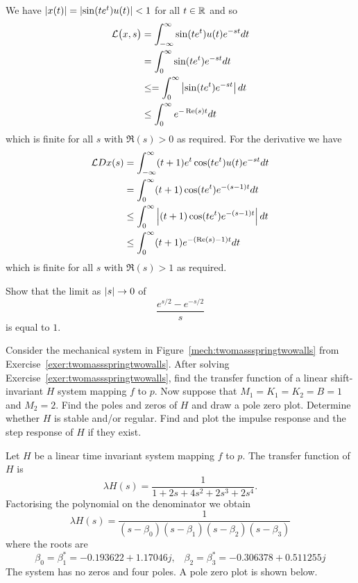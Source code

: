 \begin{excersizelist}
\begin{solution}
We have $\left\vert x(t) \right\vert = \left\vert \sin(t e^t) u(t) \right\vert < 1$ for all $t \in {\mathbb R}$ and so
\begin{align*}
\mathcal L\big( x , s\big) &= \int_{-\infty}^\infty \sin(t e^t) u(t) e^{-s t} dt \\
&= \int_{0}^\infty \sin(t e^t) e^{-s t}  dt \\
&\leq = \int_{0}^\infty \left\vert \sin(t e^t) e^{-s t} \right\vert  dt \\
&\leq \int_{0}^\infty e^{-\operatorname{Re}(s) t}  dt
\end{align*}
which is finite for all $s$ with $\Re(s) > 0$ as required.  For the derivative we have
\begin{align*}
\mathcal L D x (s) &= \int_{-\infty}^\infty (t+1)e^t \cos(t e^t) u(t) e^{-s t} dt \\
&= \int_{0}^\infty (t+1) \cos(t e^t) e^{-(s-1) t}  dt \\
&\leq \int_{0}^\infty \left\vert (t+1) \cos(t e^t) e^{-(s-1) t} \right\vert  dt \\
&\leq \int_{0}^\infty (t+1) e^{-(\operatorname{Re}(s)-1) t}  dt
\end{align*}
which is finite for all $s$ with $\Re(s) > 1$ as required.
\end{solution}

\item \label{exer:eReslimsinclike} Show that the limit as $\left\vert s \right\vert \to 0$ of 
\[
\frac{ e^{s/2} - e^{-s/2}}{s}
\]
is equal to $1$.

\begin{hardexercise}
\item \label{exer:twomassspringtwowallstranfuncpolezeros} Consider the mechanical system in Figure~\ref{mech:twomassspringtwowalls} from Exercise~\ref{exer:twomassspringtwowalls}.  After solving Exercise~\ref{exer:twomassspringtwowalls}, find the transfer function of a linear shift-invariant $H$ system mapping $f$ to $p$.  Now suppose that $M_1 = K_1 = K_2 = B = 1$ and $M_2 = 2$.  Find the poles and zeros of $H$ and draw a pole zero plot.  Determine whether $H$ is stable and/or regular.  Find and plot the impulse response and the step response of $H$ if they exist.

\begin{solution}
Let $H$ be a linear time invariant system mapping $f$ to $p$.  The transfer function of $H$ is
\[
\lambda H(s) = \frac{1}{1 + 2s + 4s^2 + 2s^3 + 2s^4}.
\]
Factorising the polynomial on the denominator we obtain
\[
\lambda H(s) = \frac{1}{(s-\beta_0)(s-\beta_1)(s-\beta_2)(s-\beta_3)}
\]
where the roots are
\[
\beta_0 = \beta_1^* = -0.193622 + 1.17046j, \;\;\; \beta_2 = \beta_3^* = -0.306378 + 0.511255j
\]
The system has no zeros and four poles.  A pole zero plot is shown below.  


\end{solution}
\end{hardexercise}
\end{excersizelist}
